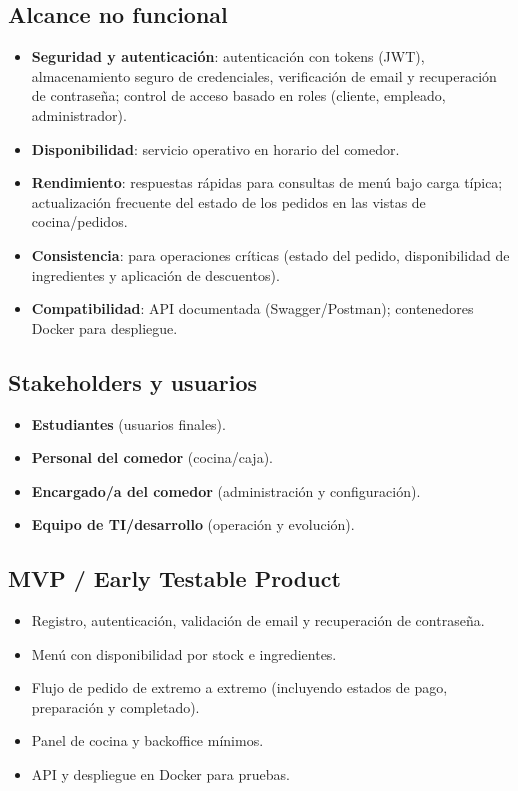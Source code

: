 \subsection{Alcance no funcional}
\begin{itemize}
  \item \textbf{Seguridad y autenticación}: autenticación con tokens (JWT), almacenamiento seguro de credenciales, verificación de email y recuperación de contraseña; control de acceso basado en roles (cliente, empleado, administrador).
  \item \textbf{Disponibilidad}: servicio operativo en horario del comedor.
  \item \textbf{Rendimiento}: respuestas rápidas para consultas de menú bajo carga típica; actualización frecuente del estado de los pedidos en las vistas de cocina/pedidos.
  \item \textbf{Consistencia}: para operaciones críticas (estado del pedido, disponibilidad de ingredientes y aplicación de descuentos).
  \item \textbf{Compatibilidad}: API documentada (Swagger/Postman); contenedores Docker para despliegue.
\end{itemize}

\subsection{Stakeholders y usuarios}
\begin{itemize}
  \item \textbf{Estudiantes} (usuarios finales).
  \item \textbf{Personal del comedor} (cocina/caja).
  \item \textbf{Encargado/a del comedor} (administración y configuración).
  \item \textbf{Equipo de TI/desarrollo} (operación y evolución).
\end{itemize}

\subsection{MVP / Early Testable Product}
\label{subsec:mvp}
\begin{itemize}
  \item Registro, autenticación, validación de email y recuperación de contraseña.
  \item Menú con disponibilidad por stock e ingredientes.
  \item Flujo de pedido de extremo a extremo (incluyendo estados de pago, preparación y completado).
  \item Panel de cocina y backoffice mínimos.
  \item API y despliegue en Docker para pruebas.
\end{itemize}

\newpage
